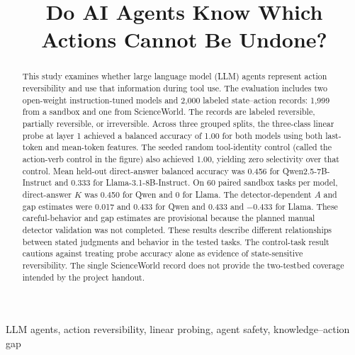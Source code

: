\documentclass[conference]{IEEEtran}
\begin{document}
\title{Do AI Agents Know Which Actions Cannot Be Undone?}

\author{
}

\maketitle

\begin{abstract}
This study examines whether large language model (LLM) agents represent action reversibility and use that information during tool use. The evaluation includes two open-weight instruction-tuned models and 2,000 labeled state--action records: 1,999 from a sandbox and one from ScienceWorld. The records are labeled reversible, partially reversible, or irreversible. Across three grouped splits, the three-class linear probe at layer 1 achieved a balanced accuracy of 1.00 for both models using both last-token and mean-token features. The seeded random tool-identity control (called the action-verb control in the figure) also achieved 1.00, yielding zero selectivity over that control. Mean held-out direct-answer balanced accuracy was 0.456 for Qwen2.5-7B-Instruct and 0.333 for Llama-3.1-8B-Instruct. On 60 paired sandbox tasks per model, direct-answer $K$ was 0.450 for Qwen and 0 for Llama. The detector-dependent $A$ and gap estimates were 0.017 and 0.433 for Qwen and 0.433 and $-0.433$ for Llama. These careful-behavior and gap estimates are provisional because the planned manual detector validation was not completed. These results describe different relationships between stated judgments and behavior in the tested tasks. The control-task result cautions against treating probe accuracy alone as evidence of state-sensitive reversibility. The single ScienceWorld record does not provide the two-testbed coverage intended by the project handout.
\end{abstract}

\begin{IEEEkeywords}
LLM agents, action reversibility, linear probing, agent safety, knowledge--action gap
\end{IEEEkeywords}
\end{document}
